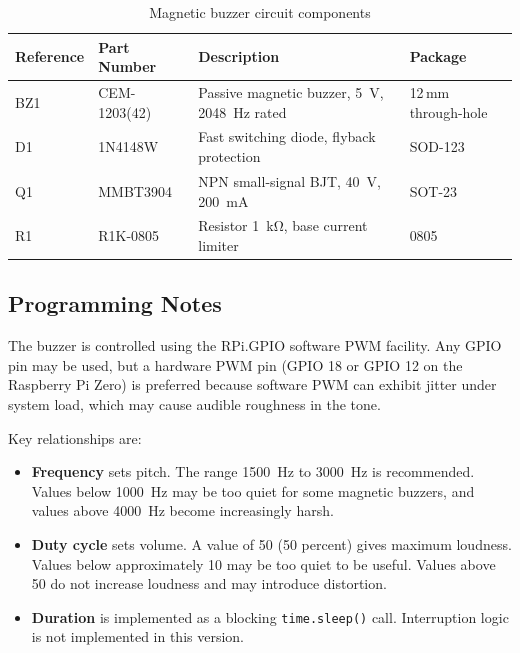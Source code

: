 \documentclass[12pt,letterpaper]{article}
\begin{document}
	\begin{table}[h]
		\centering
		\begin{tabular}{llll}
			\hline
			\textbf{Reference} & \textbf{Part Number} & \textbf{Description} & \textbf{Package} \\
			\hline
			BZ1 & CEM-1203(42)  & Passive magnetic buzzer, \SI{5}{\volt}, \SI{2048}{\hertz} rated & 12\,mm through-hole \\
			D1  & 1N4148W       & Fast switching diode, flyback protection                        & SOD-123 \\
			Q1  & MMBT3904      & NPN small-signal BJT, \SI{40}{\volt}, \SI{200}{\milli\ampere}  & SOT-23  \\
			R1  & R1K-0805      & Resistor \SI{1}{\kilo\ohm}, base current limiter               & 0805    \\
			\hline
		\end{tabular}
		\caption{Magnetic buzzer circuit components}
		\label{tab:buzzer_parts}
	\end{table}
	
	\subsection{Programming Notes}
	
	The buzzer is controlled using the RPi.GPIO software PWM facility. Any GPIO pin may
	be used, but a hardware PWM pin (GPIO 18 or GPIO 12 on the Raspberry Pi Zero) is
	preferred because software PWM can exhibit jitter under system load, which may cause
	audible roughness in the tone.
	
	Key relationships are:
	
	\begin{itemize}
		\item \textbf{Frequency} sets pitch. The range \SI{1500}{\hertz} to
		\SI{3000}{\hertz} is recommended. Values below \SI{1000}{\hertz} may be too
		quiet for some magnetic buzzers, and values above \SI{4000}{\hertz} become
		increasingly harsh.
		\item \textbf{Duty cycle} sets volume. A value of 50 (50 percent) gives maximum loudness.
		Values below approximately 10 may be too quiet to be useful. Values above 50
		do not increase loudness and may introduce distortion.
		\item \textbf{Duration} is implemented as a blocking \texttt{time.sleep()} call.
		Interruption logic is not implemented in this version.
	\end{itemize}
	
\end{document}
